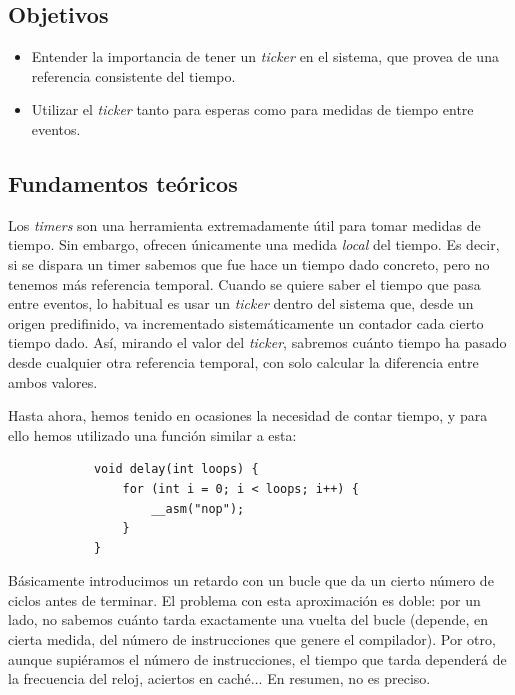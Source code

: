 \documentclass[../main.tex]{subfiles}
\begin{document}

    \subsection{Objetivos}
        \begin{itemize}
            \item Entender la importancia de tener un \emph{ticker} en el sistema, que provea de una referencia consistente del tiempo.
            \item Utilizar el \emph{ticker} tanto para esperas como para medidas de tiempo entre eventos.
        \end{itemize}

    \subsection{Fundamentos teóricos}
        
        Los \emph{timers} son una herramienta extremadamente útil para tomar medidas de tiempo. Sin embargo, ofrecen únicamente una medida \emph{local} del tiempo. Es decir, si se dispara un timer sabemos que fue hace un tiempo dado concreto, pero no tenemos más referencia temporal. Cuando se quiere saber el tiempo que pasa entre eventos, lo habitual es usar un \emph{ticker} dentro del sistema que, desde un origen predifinido, va incrementado sistemáticamente un contador cada cierto tiempo dado. Así, mirando el valor del \emph{ticker}, sabremos cuánto tiempo ha pasado desde cualquier otra referencia temporal, con solo calcular la diferencia entre ambos valores.

        Hasta ahora, hemos tenido en ocasiones la necesidad de contar tiempo, y para ello hemos utilizado una función similar a esta:

        \begin{lstlisting}
            void delay(int loops) {
                for (int i = 0; i < loops; i++) {
                    __asm("nop");
                }
            }
        \end{lstlisting}

        Básicamente introducimos un retardo con un bucle que da un cierto número de ciclos antes de terminar. El problema con esta aproximación es doble: por un lado, no sabemos cuánto tarda exactamente una vuelta del bucle (depende, en cierta medida, del número de instrucciones que genere el compilador). Por otro, aunque supiéramos el número de instrucciones, el tiempo que tarda dependerá de la frecuencia del reloj, aciertos en caché... En resumen, no es preciso.
\end{document}
